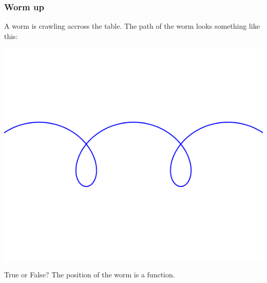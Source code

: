 \documentclass[14pt]{beamer}
\date{}
\title{}
\author{}
\begin{document}





	\begin{frame}[t]
		\frametitle{Worm up}


		A worm is crawling accross the table. The path of the worm looks something
		like this:


		\begin{center}
			\includegraphics[scale=.3]{G11}
		\end{center}

		\vspace{-1cm}

		\begin{block}{True or False?}
			The position of the worm is a function.
		\end{block}
	\end{frame}
\end{document}
